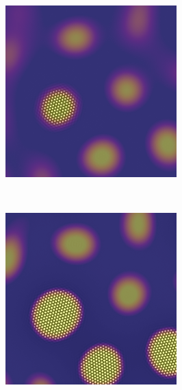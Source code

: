 \documentclass[showkeys, prb, reprint]{revtex4-1}
\begin{document}
\begin{figure}
    \vspace{0.25cm}
    \begin{subfigure}[b]{0.3\columnwidth}
        \includegraphics[width=\textwidth]{nucleation}
        \label{fig:nucleation}
        \caption{}
    \end{subfigure}
    ~
    \begin{subfigure}[b]{0.3\columnwidth}
        \includegraphics[width=\textwidth]{nucleation_and_sacrificial_growth}

\end{subfigure}
\end{figure}
\end{document}
